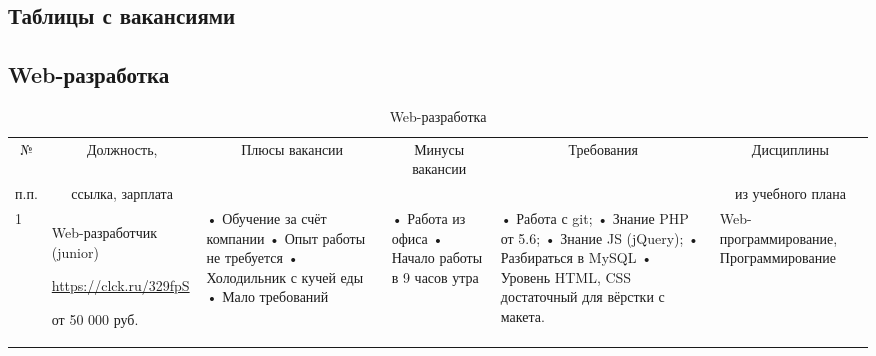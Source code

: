 \documentclass[14pt]{extreport}
\begin{document}
\begin{landscape}
\chapter{Таблицы с вакансиями\label{chapter2}}
\begin{table}[H]
	\caption{Web-разработка}\section{Web-разработка}
	\begin{center}
		\begin{small}
		\begin{tabular}{|p{0.1cm}|p{5cm}|p{4.5cm}|p{4.5cm}|p{4cm}|p{3cm}|} \hline
			\multicolumn{1}{|c|}{№}&\multicolumn{1}{c|}{Должность,}&\multicolumn{1}{c|}{Плюсы вакансии}&\multicolumn{1}{c|}{Минусы вакансии}&\multicolumn{1}{c|}{Требования}&\multicolumn{1}{c|}{Дисциплины}\\ 
			\multicolumn{1}{|c|}{п.п.}&\multicolumn{1}{c|}{ссылка, зарплата}&\multicolumn{1}{c|}{}&\multicolumn{1}{c|}{}&\multicolumn{1}{c|}{}&\multicolumn{1}{c|}{из учебного плана}\\ 
			\hline
			1 & Web-разработчик (junior)
			
			\url{https://clck.ru/329fpS}
			
			от 50 000 руб. & 
			• Обучение за счёт компании
			\newline• Опыт работы не требуется
			\newline• Холодильник с кучей еды
			\newline• Мало требований
			&
			• Работа из офиса
			\newline• Начало работы в 9 часов утра
			&
			• Работа с git;
			\newline• Знание PHP от 5.6;
			\newline• Знание JS (jQuery);
			\newline• Разбираться в MySQL
			\newline• Уровень HTML, CSS достаточный для вёрстки с макета.
			&
			Web-программирование, Программирование
			\\
			\hline
			
		\end{tabular}
	\end{small}
	\end{center}
\end{table}




\end{landscape}
\end{document}
